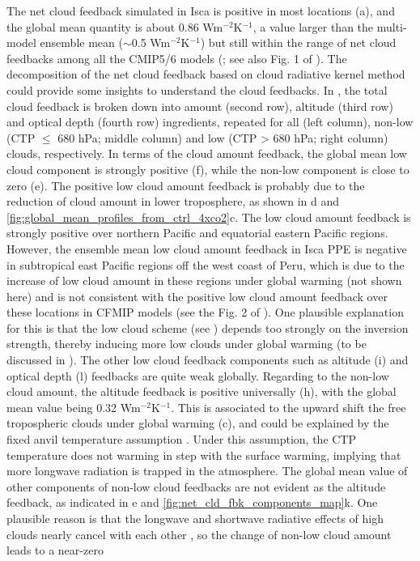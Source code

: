The net cloud feedback simulated in Isca is positive in most locations (a), and the global mean quantity is about 0.86 Wm$^{-2}$K$^{-1}$, a value larger than the multi-model ensemble mean ($\sim$0.5 Wm$^{-2}$K$^{-1}$) but still within the range of net cloud feedbacks among all the CMIP5/6 models (; see also Fig. 1 of \citealt{Zelinka2020causes}). The decomposition of the net cloud feedback based on cloud radiative kernel method could provide some insights to understand the cloud feedbacks. In , the total cloud feedback is broken down into amount (second row), altitude (third row) and optical depth (fourth row) ingredients, repeated for all (left column), non-low (CTP $\le$ 680 hPa; middle column) and low (CTP > 680 hPa; right column) clouds, respectively. In terms of the cloud amount feedback, the global mean low cloud component is strongly positive (f), while the non-low component is close to zero (e). The positive low cloud amount feedback is probably due to the reduction of cloud amount in lower troposphere, as shown in d and  \ref{fig:global_mean_profiles_from_ctrl_4xco2}c. The low cloud amount feedback is strongly positive over northern Pacific and equatorial eastern Pacific regions. However, the ensemble mean low cloud amount feedback in Isca PPE is negative in subtropical east Pacific regions off the west coast of Peru, which is due to the increase of low cloud amount in these regions under global warming (not shown here) and is not consistent with the positive low cloud amount feedback over these locations in CFMIP models (see the Fig. 2 of \citealt{Zelinka2016insights}). One plausible explanation for this is that the low cloud scheme (see ) depends too strongly on the inversion strength, thereby inducing more low clouds under global warming (to be discussed in ). The other low cloud feedback components such as altitude (i) and optical depth (l) feedbacks are quite weak globally. Regarding to the non-low cloud amount, the altitude feedback is positive universally (h), with the global mean value being 0.32 Wm$^{-2}$K$^{-1}$. This is associated to the upward shift the free tropospheric clouds under global warming (c), and could be explained by the fixed anvil temperature assumption \citep[e.g.,][]{Hartmann2002FAT, Ceppi2017}. Under this assumption, the CTP temperature does not warming in step with the surface warming, implying that more longwave radiation is trapped in the atmosphere. The global mean value of other components of non-low cloud feedbacks are not evident as the altitude feedback, as indicated in e and \ref{fig:net_cld_fbk_components_map}k. One plausible reason is that the longwave and shortwave radiative effects of high clouds nearly cancel with each other \citep{Kiehl1994observed}, so the change of non-low cloud amount leads to a near-zero 